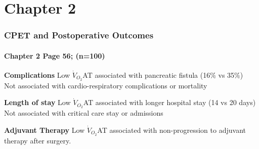 \documentclass[10pt]{beamer}
\begin{document}
\section{Chapter 2}
\begin{frame}
	\frametitle{CPET and Postoperative Outcomes}
	\framesubtitle{Chapter 2 Page 56; (n=100)}
	\begin{block}{\textbf{Complications}}
		Low $\dot{V}_{O_2}$AT associated with pancreatic fistula (16\% vs 35\%) \\
		Not associated with cardio-respiratory complications or mortality
	\end{block}
	
	\begin{block}{\textbf{Length of stay}}
		Low $\dot{V}_{O_2}$AT associated with longer hospital stay (14 vs 20 days)\\
		Not associated with critical care stay or admissions
	\end{block}
	
	\begin{block}{\textbf{Adjuvant Therapy}}
		Low $\dot{V}_{O_2}$AT associated with non-progression to adjuvant therapy after surgery.
	\end{block}
\end{frame}
\end{document}
